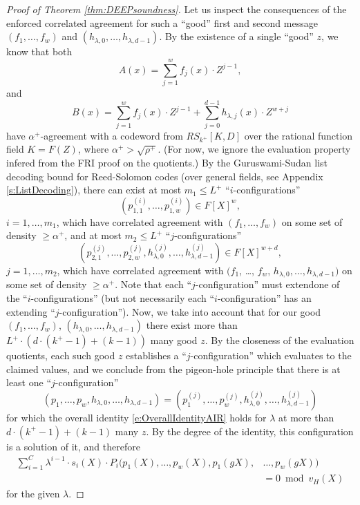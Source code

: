 \documentclass[11pt,article,oneside]{memoir}
\theoremstyle{definition}
\theoremstyle{remark}
\begin{document}
\begin{proof}[Proof of Theorem \ref{thm:DEEPsoundness}]
Let us inspect the consequences of the enforced correlated agreement for such a “good” first and second message $(f_1,\ldots,f_w)$ and $(h_{\lambda,0},\ldots,h_{\lambda,d-1})$.
By the existence of a single ``good'' $z$, we know that both
\[
A(x)= \sum_{j=1}^w f_j(x)\cdot Z^{j-1},
\]
and
\[
B(x)= \sum_{j=1}^w f_j(x)\cdot Z^{j-1} + \sum_{j=0}^{d-1} h_{\lambda, j}(x) \cdot Z^{w+j}
\] 
have $\alpha^+$-agreement with a codeword from $RS_{k^+}[K,D]$ over the rational function field $K=F(Z)$, where $\alpha^+ > \sqrt{\rho^+}$.
(For now, we ignore the evaluation property infered from the FRI proof on the quotients.)
By the Guruswami-Sudan list decoding bound for Reed-Solomon codes (over general fields, see Appendix \ref{s:ListDecoding}), there can exist at most $m_1\leq L^+$  “$i$-configurations”
\[
 \left(p_{1,1}^{(i)}, \ldots, p_{1,w}^{(i)} \right) \in F[X]^w, 
\]
$i=1,\ldots, m_1$, which have correlated agreement with $(f_1,\ldots, f_w)$ on some set of density $\geq \alpha^+$, 
and at most $m_2 \leq L^+$ ``$j$-configurations''
\[
\left(p_{2,1}^{(j)}, \ldots, p_{2,w}^{(j)}, h_{\lambda,0}^{(j)}, \ldots , h_{\lambda, d-1}^{(j)} \right)\in F[X]^{w+d}, 
\]
$j=1,\ldots,m_2$, which have correlated agreement with $(f_1$, \ldots, $f_w$, $h_{\lambda,0}, \ldots, h_{\lambda, d-1})$ on some set of density $\geq \alpha^+$.
%
Note that each ``$j$-configuration'' must extend\footnotemark one of the ``$i$-configurations'' (but not necessarily each ``$i$-configuration'' has an extending ``$j$-configuration'').
%
%
Now, we take into account that for our good $(f_1,\ldots, f_w)$, $(h_{\lambda,0},\ldots, h_{\lambda, d-1})$ there exist more than $L^+\cdot \left(d\cdot (k^+ - 1) + (k - 1)\right)$ many good $z$. 
By the closeness of the evaluation quotients, each such good $z$ establishes a ``$j$-configuration'' which evaluates to the claimed values, and we conclude from the pigeon-hole principle that there is at least one ``$j$-configuration'' 
\[
(p_1,\ldots, p_w, h_{\lambda, 0}, \ldots, h_{\lambda,d-1}) = \left(p_1^{(j)},\ldots, p_w^{(j)},h_{\lambda,0}^{(j)}, \ldots , h_{\lambda, d-1}^{(j)} \right)
\] 
for which the overall identity \eqref{e:OverallIdentityAIR} holds for $\lambda$ at more than $d\cdot (k^+-1) + (k - 1)$ many $z$. 
By the degree of the identity, this configuration is a solution of it, and therefore
\begin{equation}
\label{e:OverallIdentityAIRmodH}
\begin{aligned}
\sum_{i=1}^{C} \lambda^{i-1}\cdot s_i(X)\cdot P_i(p_1(X), \ldots, p_w(X), p_1(gX),& \ldots, p_w(g X)) 
\\
&= 0 \bmod v_H(X)
\end{aligned}
\end{equation}
for the given $\lambda$.


\end{proof}
\end{document}
